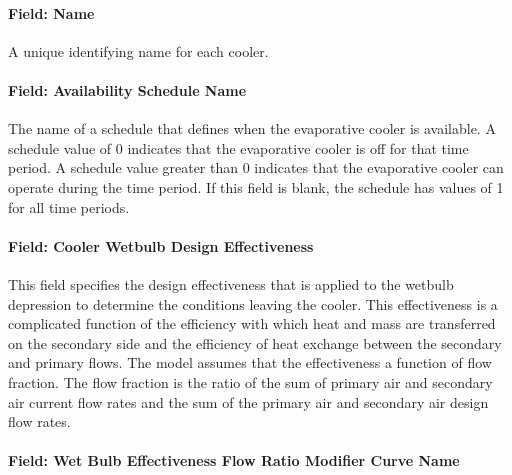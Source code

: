 \paragraph{Field: Name}\label{field-name-4-010}

A unique identifying name for each cooler.

\paragraph{Field: Availability Schedule Name}\label{field-availability-schedule-name-1-004}

The name of a schedule that defines when the evaporative cooler is available. A schedule value of 0 indicates that the evaporative cooler is off for that time period. A schedule value greater than 0 indicates that the evaporative cooler can operate during the time period. If this field is blank, the schedule has values of 1 for all time periods.

\paragraph{Field: Cooler Wetbulb Design Effectiveness}\label{field-cooler-wetbulb-design-effectiveness}

This field specifies the design effectiveness that is applied to the wetbulb depression to determine the conditions leaving the cooler. This effectiveness is a complicated function of the efficiency with which heat and mass are transferred on the secondary side and the efficiency of heat exchange between the secondary and primary flows. The model assumes that the effectiveness a function of flow fraction. The flow fraction is the ratio of the sum of primary air and secondary air current flow rates and the sum of the primary air and secondary air design flow rates.

\paragraph{Field: Wet Bulb Effectiveness Flow Ratio Modifier Curve Name}\label{field-wet-bulb-effectiveness-flow-ratio-modifier-curve-name}


